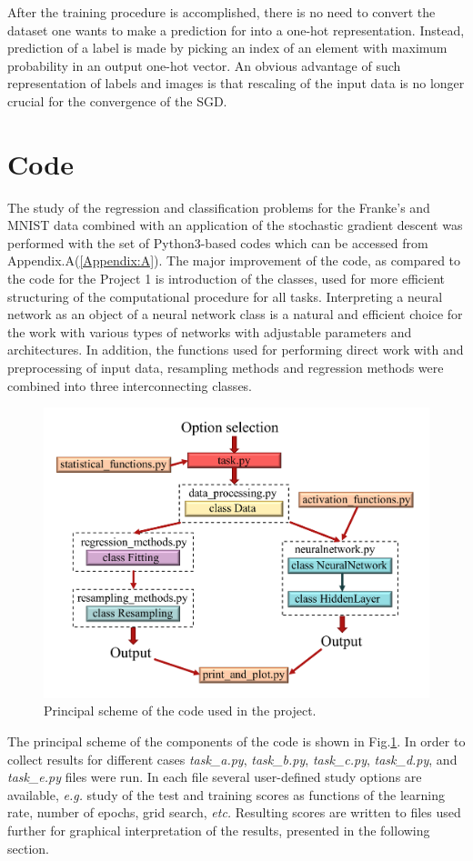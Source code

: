\documentclass{emulateapj}
\begin{document}
After the training procedure is accomplished, there is no need to convert the dataset one wants to make a prediction for into a one-hot representation. Instead, prediction of a label is made by picking an index of an element with maximum probability in an output one-hot vector. An obvious advantage of such representation of labels and images is that rescaling of the input data is no longer crucial for the convergence of the SGD.

\section{Code} \label{sec: Code}

The study of the regression and classification problems for the Franke's and MNIST data combined with an application of the stochastic gradient descent was performed with the set of Python3-based codes which can be accessed from Appendix.A(\ref{Appendix:A}). The major improvement of the code, as compared to the code for the Project 1 \cite{proj1,proj1_2} is introduction of the classes, used for more efficient structuring of the computational procedure for all tasks. Interpreting a neural network as an object of a neural network class is a natural and efficient choice for the work with various types of networks with adjustable parameters and architectures. In addition, the functions used for performing direct work with and preprocessing of input data, resampling methods and regression methods were combined into three interconnecting classes. 

\begin{figure}[h]
    \centering
    \includegraphics[width=.49\textwidth]{Figures/code.pdf}
    \caption{Principal scheme of the code used in the project.}
    \label{fig:code}
\end{figure}

The principal scheme of the components of the code is shown in Fig.\ref{fig:code}. In order to collect results for different cases \textit{task\_a.py}, \textit{task\_b.py}, \textit{task\_c.py}, \textit{task\_d.py}, and \textit{task\_e.py} files were run. In each file several user-defined study options are available, \textit{e.g.} study of the test and training scores as functions of the learning rate, number of epochs, grid search, \textit{etc.} Resulting scores are written to files used further for graphical interpretation of the results, presented in the following section.
\end{document}
